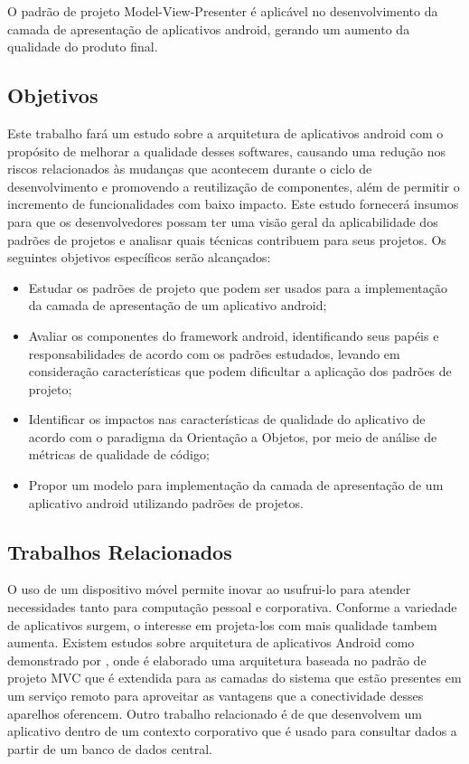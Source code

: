 \documentclass[conference]{IEEEtran}
\begin{document}
O padrão de projeto Model-View-Presenter é aplicável no desenvolvimento da
camada de apresentação de aplicativos android, gerando um aumento da qualidade
do produto final.

\subsection{Objetivos}

Este trabalho fará um estudo sobre a arquitetura de aplicativos android com o
propósito de melhorar a qualidade desses softwares, causando uma redução nos
riscos relacionados às mudanças que acontecem durante o ciclo de desenvolvimento
e promovendo a reutilização de componentes,  além de permitir o incremento de funcionalidades com
baixo impacto. Este estudo fornecerá insumos para que os desenvolvedores possam
ter uma visão geral da aplicabilidade dos padrões de projetos e analisar quais
técnicas contribuem para seus projetos. Os seguintes objetivos específicos serão alcançados:

\begin{itemize}
\item Estudar os padrões de projeto que podem ser usados para a implementação da
camada de apresentação de um aplicativo android;
\item Avaliar os componentes do  framework android, identificando seus papéis e
responsabilidades de acordo com os padrões estudados, levando  em consideração
características que podem dificultar a aplicação dos padrões de projeto;
\item Identificar os impactos nas características de qualidade do aplicativo de acordo
com o paradigma da Orientação a Objetos, por meio de análise de métricas de
qualidade de código;
\item Propor um modelo para implementação da camada de
apresentação de um aplicativo android utilizando padrões de projetos.
\end{itemize}

\subsection{Trabalhos Relacionados}

O uso de um dispositivo móvel permite inovar ao usufrui-lo para atender
necessidades tanto para computação pessoal e corporativa. Conforme a variedade
de aplicativos surgem, o interesse em projeta-los com mais qualidade tambem
aumenta. Existem estudos sobre arquitetura de aplicativos Android como
demonstrado por \cite{BMVC}, onde é elaborado uma arquitetura baseada no
padrão de projeto MVC que é extendida para as camadas do sistema que estão
presentes em um serviço remoto para aproveitar as vantagens que a conectividade
desses aparelhos oferencem. Outro trabalho relacionado é
de \cite{corporateandroid} que desenvolvem um aplicativo dentro de um
contexto corporativo que é usado para consultar dados a partir de um banco de
dados central.
\end{document}
